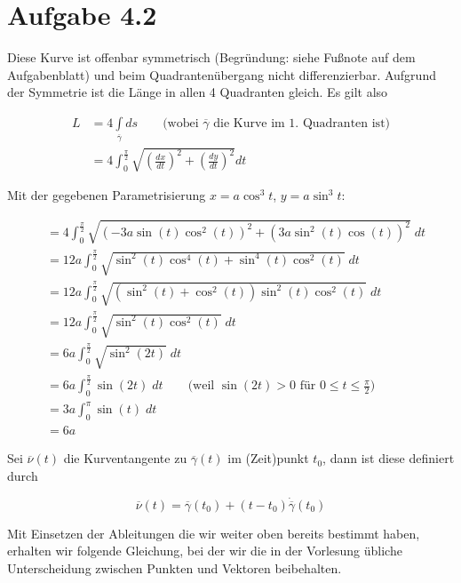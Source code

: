 \documentclass[a4paper,german,12pt,smallheadings]{scrartcl}
\begin{document}
\section*{Aufgabe 4.2}

Diese Kurve ist offenbar symmetrisch (Begründung: siehe Fußnote auf dem
Aufgabenblatt) und beim Quadrantenübergang nicht differenzierbar. Aufgrund der
Symmetrie ist die Länge in allen 4 Quadranten gleich. Es gilt also

\begin{align*}
  L &= 4 \int\limits_{\overline{\gamma}}  ds \qquad \text{(wobei }\overline{\gamma}\text{ die Kurve im 1. Quadranten ist)} \\
    &= 4 \int_0^{\frac{\pi}{2}} \sqrt{\left(\frac{dx}{dt}\right)^2 + \left(\frac{dy}{dt}\right)^2} dt
\end{align*}

Mit der gegebenen Parametrisierung $x=a \cos^3 t$, $y = a \sin^3 t$:

\begin{align*}
  &= 4 \int_0^{\frac{\pi}{2}}   \sqrt{\left(-3a \sin(t) \cos^2(t) \right)^2 + \left(3a \sin^2(t) \cos(t)\right)^2} \; dt \\
  &= 12a \int_0^{\frac{\pi}{2}} \sqrt{\sin^2(t) \cos^4(t) + \sin^4(t) \cos^2(t)} \; dt \\
  &= 12a \int_0^{\frac{\pi}{2}} \sqrt{(\sin^2(t) + \cos^2(t)) \sin^2(t)\cos^2(t)} \; dt \\
  &= 12a \int_0^{\frac{\pi}{2}} \sqrt{\sin^2(t)\cos^2(t)} \; dt \\
  &= 6a \int_0^{\frac{\pi}{2}}  \sqrt{\sin^2(2t)} \; dt \\
  &= 6a \int_0^{\frac{\pi}{2}}  \sin(2t) \; dt \qquad \text{(weil $\sin(2t) > 0$ für $0 \le t \le \frac{\pi}{2}$)} \\
  &= 3a \int_0^{\pi}            \sin(t) \; dt \\
  &= 6a
\end{align*}

Sei $\overline{\nu}(t)$ die Kurventangente zu $\overline{\gamma}(t)$ im
(Zeit)punkt $t_0$, dann ist diese definiert durch

\begin{equation*}
  \overline{\nu}(t) = \overline{\gamma}(t_0) + (t - t_0) \dot{\overline{\gamma}}(t_0)
\end{equation*}

Mit Einsetzen der Ableitungen die wir weiter oben bereits bestimmt haben,
erhalten wir folgende Gleichung, bei der wir die in der Vorlesung übliche
Unterscheidung zwischen Punkten und Vektoren beibehalten.
\end{document}
